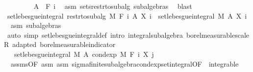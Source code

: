\begin{isabellebody}
\ \ \ \ \ \ \isamarkupfalse%
\ {\isacharasterisk}{\kern0pt}{\isacharcolon}{\kern0pt}\ {\isachardoublequoteopen}A\ {\isasymin}\ F\ i{\isachardoublequoteclose}\ \isamarkupfalse%
\ asm\ sets{\isacharunderscore}{\kern0pt}restr{\isacharunderscore}{\kern0pt}to{\isacharunderscore}{\kern0pt}subalg\ subalgebras\ \isamarkupfalse%
\ blast\isanewline
\ \ \ \ \ \ \isamarkupfalse%
\ {\isachardoublequoteopen}set{\isacharunderscore}{\kern0pt}lebesgue{\isacharunderscore}{\kern0pt}integral\ {\isacharparenleft}{\kern0pt}restr{\isacharunderscore}{\kern0pt}to{\isacharunderscore}{\kern0pt}subalg\ M\ {\isacharparenleft}{\kern0pt}F\ i{\isacharparenright}{\kern0pt}{\isacharparenright}{\kern0pt}\ A\ {\isacharparenleft}{\kern0pt}X\ i{\isacharparenright}{\kern0pt}\ {\isacharequal}{\kern0pt}\ set{\isacharunderscore}{\kern0pt}lebesgue{\isacharunderscore}{\kern0pt}integral\ M\ A\ {\isacharparenleft}{\kern0pt}X\ i{\isacharparenright}{\kern0pt}{\isachardoublequoteclose}\ \isamarkupfalse%
\ {\isacharasterisk}{\kern0pt}\ asm\ subalgebras\ \isamarkupfalse%
\ {\isacharparenleft}{\kern0pt}auto\ simp{\isacharcolon}{\kern0pt}\ set{\isacharunderscore}{\kern0pt}lebesgue{\isacharunderscore}{\kern0pt}integral{\isacharunderscore}{\kern0pt}def\ intro{\isacharcolon}{\kern0pt}\ integral{\isacharunderscore}{\kern0pt}subalgebra{}\ borel{\isacharunderscore}{\kern0pt}measurable{\isacharunderscore}{\kern0pt}scaleR\ adapted\ borel{\isacharunderscore}{\kern0pt}measurable{\isacharunderscore}{\kern0pt}indicator{\isacharparenright}{\kern0pt}\ \isanewline
\ \ \ \ \ \ \isamarkupfalse%
\ \isamarkupfalse%
\ {\isachardoublequoteopen}{\isachardot}{\kern0pt}{\isachardot}{\kern0pt}{\isachardot}{\kern0pt}\ {\isasymle}\ set{\isacharunderscore}{\kern0pt}lebesgue{\isacharunderscore}{\kern0pt}integral\ M\ A\ {\isacharparenleft}{\kern0pt}cond{\isacharunderscore}{\kern0pt}exp\ M\ {\isacharparenleft}{\kern0pt}F\ i{\isacharparenright}{\kern0pt}\ {\isacharparenleft}{\kern0pt}X\ j{\isacharparenright}{\kern0pt}{\isacharparenright}{\kern0pt}{\isachardoublequoteclose}\ \isamarkupfalse%
\ {\isacharasterisk}{\kern0pt}\ assms{\isacharparenleft}{\kern0pt}{}{\isacharparenright}{\kern0pt}{\isacharbrackleft}{\kern0pt}OF\ asm{\isacharbrackright}{\kern0pt}\ asm\ sigma{\isacharunderscore}{\kern0pt}finite{\isacharunderscore}{\kern0pt}subalgebra{\isachardot}{\kern0pt}cond{\isacharunderscore}{\kern0pt}exp{\isacharunderscore}{\kern0pt}set{\isacharunderscore}{\kern0pt}integral{\isacharbrackleft}{\kern0pt}OF\ {\isacharunderscore}{\kern0pt}\ integrable{\isacharbrackright}{\kern0pt}\ \isamarkupfalse%

\end{isabellebody}
